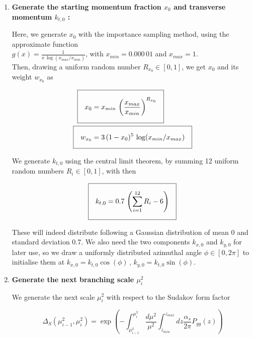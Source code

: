 \documentclass[a4paper,10pt]{report}
\begin{document}
    \begin{enumerate}
        \item \textbf{Generate the starting momentum fraction $x_0$ and transverse momentum $k_{t,0}$ :}
        
              Here, we generate $x_0$ with the importance sampling method, using the approximate 
              function \\$g(x) = \frac{1}{x\,\log(x_{max}/x_{min})}$, with $x_{min} = 0.000\,01$ and $x_{max} = 1$.\\
              Then, drawing a uniform random number $R_{x_0} \in [0,1]$, we get $x_0$ and its weight $w_{x_0}$ as 

              \begin{align}
              \setlength\fboxsep{1em}
              \Aboxed{x_0 &= x_{min}\,\left(\frac{x_{max}}{x_{min}}\right)^{R_{x_0}}} \\
              \setlength\fboxsep{1em}
              \Aboxed{w_{x_0} &= 3\,(1-x_0)^5\,\log(x_{min}/x_{max})}  \label{eq:simp_wx0}   
              \end{align}
              
              We generate $k_{t,0}$ using the central limit theorem, by summing 12 uniform random numbers 
              $R_i \in [0,1]$, with then

              \begin{equation}
                \setlength\fboxsep{1em}
                \boxed{k_{t,0} = 0.7\,\left(\sum_{i=1}^{12}R_i -6\right)}
              \end{equation}

              These will indeed distribute following a Gaussian distribution of mean 0 and standard 
              deviation 0.7. We also need the two components $k_{x,0}$ and $k_{y,0}$ for later use, 
              so we draw a uniformly distributed azimuthal angle $\phi \in [0, 2\pi]$ to initialise 
              them at $k_{x,0} = k_{t,0}\cos(\phi)\,,\,k_{y,0} = k_{t,0}\sin(\phi)$.\\

        \item \textbf{Generate the next branching scale $\mu_i^2$}
        
              We generate the next scale $\mu_i^2$ with respect to the Sudakov form factor

              \begin{equation}
              \Delta_S(\mu_{i-1}^2, \mu_i^2) = \exp\left(-\int_{\mu_{i-1}^2}^{\mu_i^2}\frac{d\mu^2}{\mu^2}\int_{z_{min}}^{z_{max}}dz\frac{\alpha_s}{2\pi}P_{gg}(z)\right)
              \end{equation}


\end{enumerate}
\end{document}
